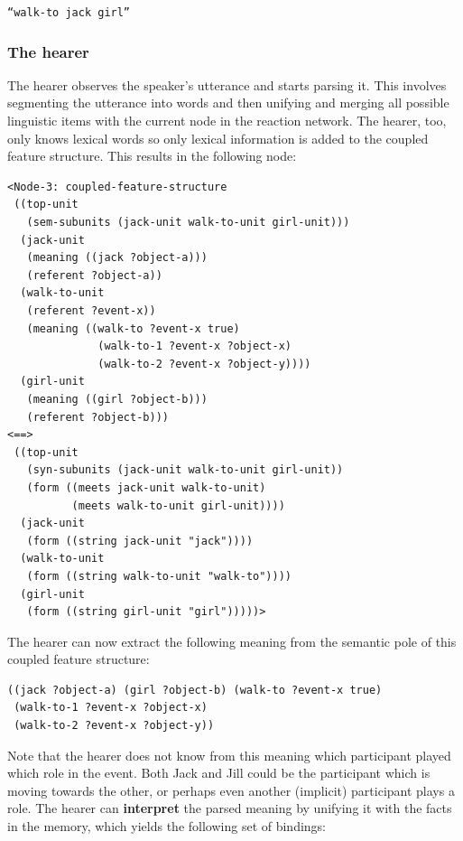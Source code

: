 \ea
\texttt{``walk-to jack girl''}
\z

\subsubsection{The hearer}
 The hearer observes the speaker's utterance and starts parsing it. This involves segmenting the utterance into words and then unifying and merging all possible linguistic items with the current node in the reaction network. The hearer, too, only knows lexical words so only lexical information is added to the coupled feature structure. This results in the following node:


\ea
\begin{lstlisting}
<Node-3: coupled-feature-structure
 ((top-unit
   (sem-subunits (jack-unit walk-to-unit girl-unit)))
  (jack-unit
   (meaning ((jack ?object-a)))
   (referent ?object-a))
  (walk-to-unit
   (referent ?event-x))
   (meaning ((walk-to ?event-x true)
              (walk-to-1 ?event-x ?object-x)
              (walk-to-2 ?event-x ?object-y))))
  (girl-unit
   (meaning ((girl ?object-b)))
   (referent ?object-b)))
<==>
 ((top-unit
   (syn-subunits (jack-unit walk-to-unit girl-unit))
   (form ((meets jack-unit walk-to-unit) 
          (meets walk-to-unit girl-unit))))
  (jack-unit
   (form ((string jack-unit "jack"))))
  (walk-to-unit
   (form ((string walk-to-unit "walk-to"))))
  (girl-unit
   (form ((string girl-unit "girl")))))>
\end{lstlisting}
\z


The hearer can now extract the following meaning from the semantic pole of this coupled feature structure:

\ea
\begin{lstlisting}
((jack ?object-a) (girl ?object-b) (walk-to ?event-x true)
 (walk-to-1 ?event-x ?object-x) 
 (walk-to-2 ?event-x ?object-y))
\end{lstlisting}
\z

Note that the hearer does not know from this meaning which participant played which role in the event. Both Jack and Jill could be the participant which is moving towards the other, or perhaps even another (implicit) participant plays a role. The hearer can {\bfseries interpret} the parsed meaning by unifying it with the facts in the memory, which yields the following set of bindings:

